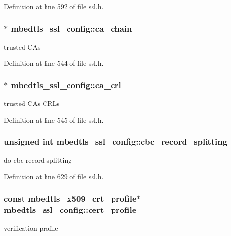 Definition at line 592 of file ssl.\-h.

\hypertarget{structmbedtls__ssl__config_a4087cd54ed61e8a5792725e0fcdf1321}{
\subsubsection[{ca\-\_\-chain}]{$\ast$ mbedtls\-\_\-ssl\-\_\-config\-::ca\-\_\-chain}}\label{structmbedtls__ssl__config_a4087cd54ed61e8a5792725e0fcdf1321}
trusted C\-As 

Definition at line 544 of file ssl.\-h.

\hypertarget{structmbedtls__ssl__config_a2ccccedcad4f76e3337a4b530cedc3a2}{
\subsubsection[{ca\-\_\-crl}]{$\ast$ mbedtls\-\_\-ssl\-\_\-config\-::ca\-\_\-crl}}\label{structmbedtls__ssl__config_a2ccccedcad4f76e3337a4b530cedc3a2}
trusted C\-As C\-R\-Ls 

Definition at line 545 of file ssl.\-h.

\hypertarget{structmbedtls__ssl__config_a053c327dda99451c6e82cda73e27d322}{
\subsubsection[{cbc\-\_\-record\-\_\-splitting}]{\setlength{\rightskip}{0pt plus 5cm}unsigned int mbedtls\-\_\-ssl\-\_\-config\-::cbc\-\_\-record\-\_\-splitting}}\label{structmbedtls__ssl__config_a053c327dda99451c6e82cda73e27d322}
do cbc record splitting 

Definition at line 629 of file ssl.\-h.

\hypertarget{structmbedtls__ssl__config_a72c287eeb318ef4975b28619d0413419}{
\subsubsection[{cert\-\_\-profile}]{\setlength{\rightskip}{0pt plus 5cm}const {\bf mbedtls\-\_\-x509\-\_\-crt\-\_\-profile}$\ast$ mbedtls\-\_\-ssl\-\_\-config\-::cert\-\_\-profile}}\label{structmbedtls__ssl__config_a72c287eeb318ef4975b28619d0413419}
verification profile 

